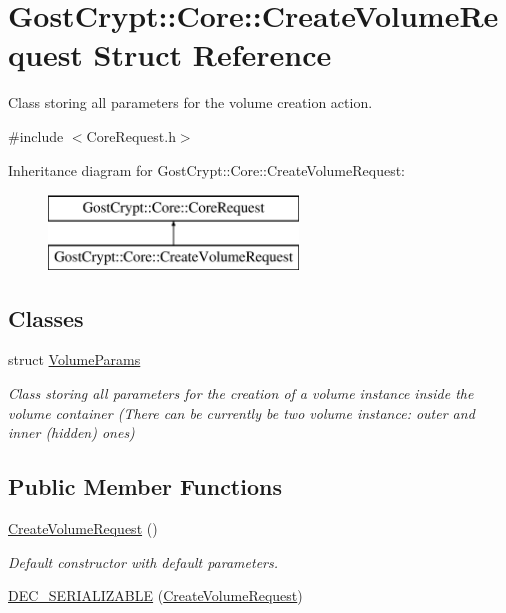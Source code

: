 \hypertarget{struct_gost_crypt_1_1_core_1_1_create_volume_request}{}\section{Gost\+Crypt\+:\+:Core\+:\+:Create\+Volume\+Request Struct Reference}
\label{struct_gost_crypt_1_1_core_1_1_create_volume_request}


Class storing all parameters for the volume creation action.  




{\ttfamily \#include $<$Core\+Request.\+h$>$}

Inheritance diagram for Gost\+Crypt\+:\+:Core\+:\+:Create\+Volume\+Request\+:\begin{figure}[H]
\begin{center}
\leavevmode
\includegraphics[height=2.000000cm]{struct_gost_crypt_1_1_core_1_1_create_volume_request}
\end{center}
\end{figure}
\subsection*{Classes}
\begin{DoxyCompactItemize}
\item 
struct \hyperlink{struct_gost_crypt_1_1_core_1_1_create_volume_request_1_1_volume_params}{Volume\+Params}
\begin{DoxyCompactList}\small\item\em Class storing all parameters for the creation of a volume instance inside the volume container (There can be currently be two volume instance\+: outer and inner (hidden) ones) \end{DoxyCompactList}\end{DoxyCompactItemize}
\subsection*{Public Member Functions}
\begin{DoxyCompactItemize}
\item 
\hyperlink{struct_gost_crypt_1_1_core_1_1_create_volume_request_ad825b9509e91345874223eed5f086b17}{Create\+Volume\+Request} ()
\begin{DoxyCompactList}\small\item\em Default constructor with default parameters. \end{DoxyCompactList}\item 
\hyperlink{struct_gost_crypt_1_1_core_1_1_create_volume_request_a2fb7c35452a0589afbd69e4a5e040405}{D\+E\+C\+\_\+\+S\+E\+R\+I\+A\+L\+I\+Z\+A\+B\+LE} (\hyperlink{struct_gost_crypt_1_1_core_1_1_create_volume_request}{Create\+Volume\+Request})
\end{DoxyCompactItemize}
